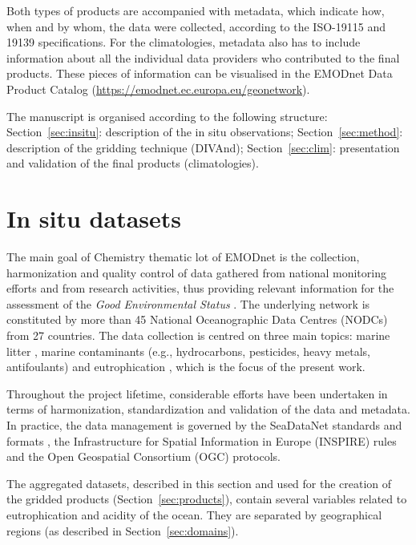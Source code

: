 \documentclass[essd,manuscript]{copernicus}
\begin{document}
Both types of products are accompanied with metadata, which indicate how, when and by whom, the data were collected, according to the ISO-19115 and 19139 specifications. For the climatologies, metadata also has to include information about all the individual data providers who contributed to the final products. These pieces of information can be visualised in the EMODnet Data Product Catalog (\url{https://emodnet.ec.europa.eu/geonetwork}).

The manuscript is organised according to the following structure: Section~\ref{sec:insitu}: description of the in situ observations; Section~\ref{sec:method}: description of the gridding technique (DIVAnd); Section~\ref{sec:clim}: presentation and validation of the final products (climatologies). 


\section{In situ datasets\label{sec:insitu}}

The main goal of Chemistry thematic lot of EMODnet is the collection, harmonization and quality control of data gathered from national monitoring efforts and from research activities, thus providing relevant information for the assessment of the \textit{Good Environmental Status} \citep[GES,][]{Vinci2017}. The underlying network is constituted by more than 45 National Oceanographic Data Centres (NODCs) from 27 countries. The data collection is centred on three main topics: marine litter \citep{Vinci2018}, marine contaminants (e.g., hydrocarbons, pesticides, heavy metals, antifoulants) and eutrophication \citep{Giorgetti2020}, which is the focus of the present work. 

Throughout the project lifetime, considerable efforts have been undertaken in terms of harmonization, standardization and validation of the data and metadata. In practice, the data management is governed by the SeaDataNet standards and formats \citep{Schaap2010}, the Infrastructure for Spatial Information in Europe (INSPIRE) rules and the Open Geospatial Consortium (OGC) protocols. 

The aggregated datasets, described in this section and used for the creation of the gridded products (Section~\ref{sec:products}), contain several variables related to eutrophication and acidity of the ocean. They are separated by geographical regions (as described in Section~\ref{sec:domains}).
\end{document}

